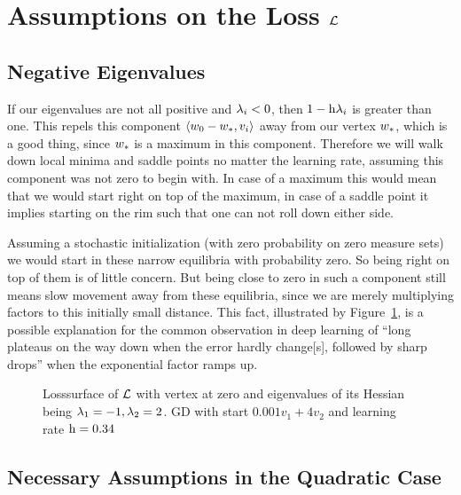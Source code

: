 \section{Assumptions on the Loss \texorpdfstring{\(\mathcal{L}\)}{ℒ}}

\subsection{Negative Eigenvalues}\label{subsec: Negative Eigenvalues}

If our eigenvalues are not all positive and \(\lambda_i<0\), then
\(1-\text{h}\lambda_i\) is greater than one. This repels this component
\(\langle w_0 - w_*, v_i\rangle\) away from our vertex \(w_*\),
which is a good thing, since \(w_*\) is a maximum in this component. Therefore
we will walk down local minima and saddle points no matter the learning
rate, assuming this component was not zero to begin with. In case of a maximum
this would mean that we would start right on top of the maximum, in case of a
saddle point it implies starting on the rim such that one can not roll down
either side.

Assuming a stochastic initialization (with zero probability on zero measure
sets) we would start in these narrow equilibria with probability zero. So
being right on top of them is of little concern. But being close to zero in such
a component still means slow movement away from these equilibria, since we are
merely multiplying factors to this initially small distance. This fact,
illustrated by Figure~\ref{fig: visualize saddle point gd}, is a possible
explanation for the common observation in deep learning of ``long plateaus on
the way down when the error hardly change[s], followed by sharp drops''
\parencite{sejnowskiUnreasonableEffectivenessDeep2020} when the exponential
factor ramps up.
%
\begin{figure}[h]
	\centering
	\def\svgwidth{1\textwidth}
	
	\caption{Losssurface of \(\mathcal{L}\) with vertex at zero and eigenvalues of its
	Hessian being \(\lambda_1=-1, \lambda_2=2\). GD with start
	\(0.001v_1+4v_2\) and learning rate \(\text{h}=0.34\)}
	\label{fig: visualize saddle point gd}
\end{figure}

\subsection{Necessary Assumptions in the Quadratic Case}
\label{subsec: necessary assumptions in the quadratic case}

